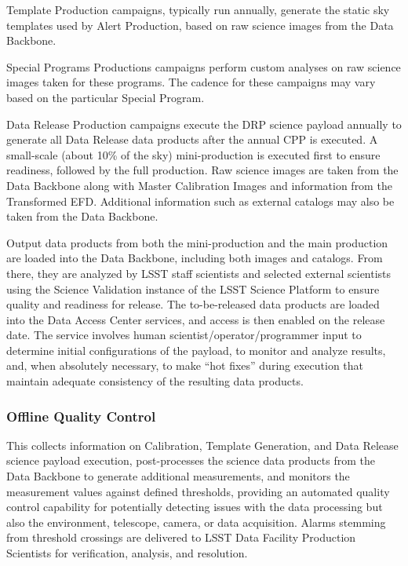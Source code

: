 \documentclass[DM,toc,lsstdraft]{lsstdoc}
\begin{document}
Template Production campaigns, typically run annually, generate the static sky templates used by Alert Production, based on raw science images from the Data Backbone.

Special Programs Productions campaigns perform custom analyses on raw science images taken for these programs.
The cadence for these campaigns may vary based on the particular Special Program.

Data Release Production campaigns execute the DRP science payload annually to generate all
Data Release data products after the annual CPP is executed. A small-scale
(about 10\% of the sky) mini-production is executed first to ensure
readiness, followed by the full production. Raw science images are taken
from the Data Backbone along with Master Calibration Images and
information from the Transformed EFD. Additional information such as
external catalogs may also be taken from the Data Backbone.

Output data products from both the mini-production and the main
production are loaded into the Data Backbone, including both images and
catalogs. From there, they are analyzed by LSST staff scientists and
selected external scientists using the Science Validation instance of
the LSST Science Platform to ensure quality and readiness for release.
The to-be-released data products are loaded into the Data Access Center
services, and access is then enabled on the release date. The service
involves human scientist/operator/programmer input to determine initial
configurations of the payload, to monitor and analyze results, and, when
absolutely necessary, to make ``hot fixes'' during execution that
maintain adequate consistency of the resulting data products.

\subsubsection{Offline Quality Control}\label{offline-quality-control}

This collects information on Calibration, Template Generation, and Data Release science payload execution,
post-processes the science data products from the Data Backbone to
generate additional measurements, and monitors the measurement values
against defined thresholds, providing an automated quality control
capability for potentially detecting issues with the data processing but
also the environment, telescope, camera, or data acquisition. Alarms
stemming from threshold crossings are delivered to LSST Data Facility
Production Scientists for verification, analysis, and resolution.
\end{document}
